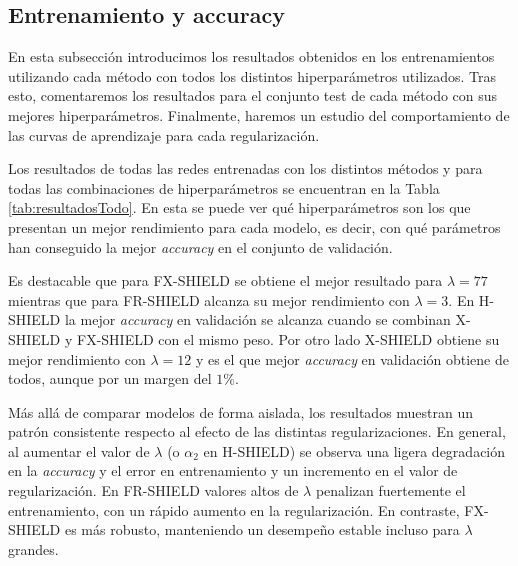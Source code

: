\subsection{Entrenamiento y accuracy}

En esta subsección introducimos los resultados obtenidos en los entrenamientos utilizando cada método con todos los distintos hiperparámetros utilizados. Tras esto, comentaremos los resultados para el conjunto test de cada método con sus mejores hiperparámetros. Finalmente, haremos un estudio del comportamiento de las curvas de aprendizaje para cada regularización.

Los resultados de todas las redes entrenadas con los distintos métodos y para todas las combinaciones de hiperparámetros se encuentran en la Tabla \ref{tab:resultadosTodo}. En esta se puede ver qué hiperparámetros son los que presentan un mejor rendimiento para cada modelo, es decir, con qué parámetros han conseguido la mejor \textit{accuracy} en el conjunto de validación. 

Es destacable que para FX-SHIELD se obtiene el mejor resultado para $\lambda = 77$ mientras que para FR-SHIELD alcanza su mejor rendimiento con $\lambda = 3$. En H-SHIELD la mejor \textit{accuracy} en validación se alcanza cuando se combinan X-SHIELD y FX-SHIELD con el mismo peso. Por otro lado X-SHIELD obtiene su mejor rendimiento con $\lambda = 12$ y es el que mejor \textit{accuracy} en validación obtiene de todos, aunque por un margen del $1\%$.

Más allá de comparar modelos de forma aislada, los resultados muestran un patrón consistente respecto al efecto de las distintas regularizaciones. En general, al aumentar el valor de $\lambda$ (o $\alpha_2$ en H-SHIELD) se observa una ligera degradación en la \textit{accuracy} y el error en entrenamiento y un incremento en el valor de regularización. En FR-SHIELD valores altos de $\lambda$ penalizan fuertemente el entrenamiento, con un rápido aumento en la regularización. En contraste, FX-SHIELD es más robusto, manteniendo un desempeño estable incluso para $\lambda$ grandes. 


